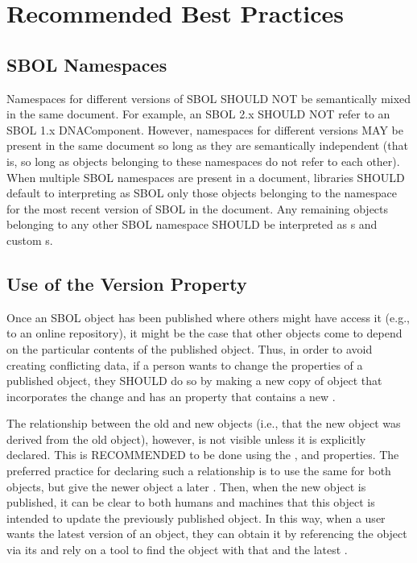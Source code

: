 \section{Recommended Best Practices}
\label{sec:bestpractices}
\subsection{SBOL Namespaces}

Namespaces for different versions of SBOL SHOULD NOT be semantically mixed in the same document. For example, an SBOL 2.x  SHOULD NOT refer to an SBOL 1.x DNAComponent. However, namespaces for different versions MAY be present in the same document so long as they are semantically independent (that is, so long as objects belonging to these namespaces do not refer to each other). When multiple SBOL namespaces are present in a document, libraries SHOULD default to interpreting as SBOL only those objects belonging to the namespace for the most recent version of SBOL in the document. Any remaining objects belonging to any other SBOL namespace SHOULD be interpreted as s and custom s.

\subsection{Use of the Version Property}

Once an SBOL object has been published where others might have access it (e.g., to an online repository), it might be the case that other objects come to depend on the particular contents of the published object. 
Thus, in order to avoid creating conflicting data, if a person wants to change the properties of a published object, they SHOULD do so by making a new copy of object that incorporates the change and has an  property that contains a new .

The relationship between the old and new objects (i.e., that the new object was derived from the old object), however, is not visible unless it is explicitly declared.  This is RECOMMENDED to be done using the , and  properties. The preferred practice for declaring such a relationship is to use the same  for both objects, but give the newer object a later . Then, when the new object is published, it can be clear to both humans and machines that this object is intended to update the previously published object. In this way, when a user wants the latest version of an object, they can obtain it by referencing the object via its  and rely on a tool to find the object with that  and the latest .


